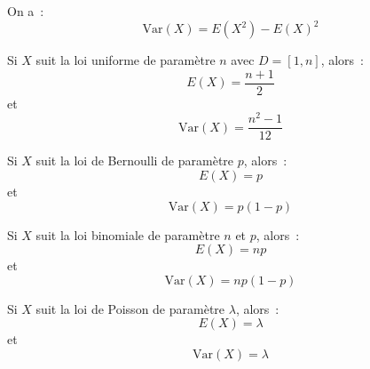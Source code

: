 \documentclass[a4paper, titlepage]{article}
\begin{document}
	\begin{props}
		On a~:
		$$ \mathrm{Var}(X) = E(X^2) - E(X)^2 $$
	\end{props}

	\begin{thm}
		Si $X$ suit la loi uniforme de paramètre $n$ avec $D=[1,n]$, alors~:
		$$ E(X) = \frac{n+1}{2} $$
		et
		$$ \mathrm{Var}(X) = \frac{n^2-1}{12} $$
	\end{thm}

	\begin{thm}
		Si $X$ suit la loi de Bernoulli de paramètre $p$, alors~:
		$$ E(X) = p $$
		et
		$$ \mathrm{Var}(X) = p(1-p) $$
	\end{thm}

	\begin{thm}
		Si $X$ suit la loi binomiale de paramètre $n$ et $p$, alors~:
		$$ E(X) = np $$
		et
		$$ \mathrm{Var}(X) = np(1-p) $$
	\end{thm}

	\begin{thm}
		Si $X$ suit la loi de Poisson de paramètre $\lambda$, alors~:
		$$ E(X) = \lambda $$
		et
		$$ \mathrm{Var}(X) = \lambda $$
	\end{thm}
\end{document}
